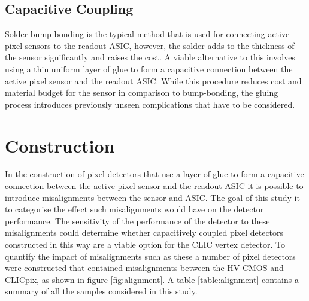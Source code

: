 
\subsection{Capacitive Coupling}
Solder bump-bonding is the typical method that is used for connecting active pixel sensors to the readout ASIC, however, the solder adds to the thickness of the sensor significantly and raises the cost.  A viable alternative to this involves using a thin uniform layer of glue to form a capacitive connection between the active pixel sensor and the readout ASIC.  While this procedure reduces cost and material budget for the sensor in comparison to bump-bonding, the gluing process introduces previously unseen complications that have to be considered.  


\section{Construction}
In the construction of pixel detectors that use a layer of glue to form a capacitive connection between the active pixel sensor and the readout ASIC it is possible to introduce misalignments between the sensor and ASIC.  The goal of this study it to categorise the effect such misalignments would have on the detector performance.  The sensitivity of the performance of the detector to these misalignments could determine whether capacitively coupled pixel detectors constructed in this way are a viable option for the CLIC vertex detector.  To quantify the impact of misalignments such as these a number of pixel detectors were constructed that contained misalignments between the HV-CMOS and CLICpix, as shown in figure \ref{fig:alignment}.  A table \ref{table:alignment} contains a summary of all the samples considered in this study.

